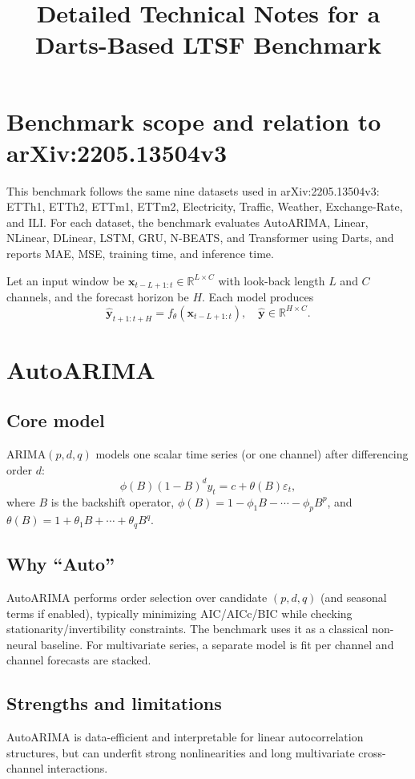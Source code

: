 \documentclass[11pt]{article}
\title{Detailed Technical Notes for a Darts-Based LTSF Benchmark}
\date{}
\begin{document}
\maketitle

\section{Benchmark scope and relation to arXiv:2205.13504v3}
This benchmark follows the same nine datasets used in arXiv:2205.13504v3: ETTh1, ETTh2, ETTm1, ETTm2, Electricity, Traffic, Weather, Exchange-Rate, and ILI. For each dataset, the benchmark evaluates AutoARIMA, Linear, NLinear, DLinear, LSTM, GRU, N-BEATS, and Transformer using Darts, and reports MAE, MSE, training time, and inference time.

Let an input window be $\mathbf{x}_{t-L+1:t}\in\mathbb{R}^{L\times C}$ with look-back length $L$ and $C$ channels, and the forecast horizon be $H$. Each model produces
\[
\hat{\mathbf{y}}_{t+1:t+H} = f_\theta(\mathbf{x}_{t-L+1:t}), \quad \hat{\mathbf{y}}\in\mathbb{R}^{H\times C}.
\]

\section{AutoARIMA}
\subsection{Core model}
ARIMA$(p,d,q)$ models one scalar time series (or one channel) after differencing order $d$:
\[
\phi(B)(1-B)^d y_t = c + \theta(B)\varepsilon_t,
\]
where $B$ is the backshift operator, $\phi(B)=1-\phi_1B-\cdots-\phi_pB^p$, and $\theta(B)=1+\theta_1B+\cdots+\theta_qB^q$.

\subsection{Why ``Auto''}
AutoARIMA performs order selection over candidate $(p,d,q)$ (and seasonal terms if enabled), typically minimizing AIC/AICc/BIC while checking stationarity/invertibility constraints. The benchmark uses it as a classical non-neural baseline. For multivariate series, a separate model is fit per channel and channel forecasts are stacked.

\subsection{Strengths and limitations}
AutoARIMA is data-efficient and interpretable for linear autocorrelation structures, but can underfit strong nonlinearities and long multivariate cross-channel interactions.
\end{document}
